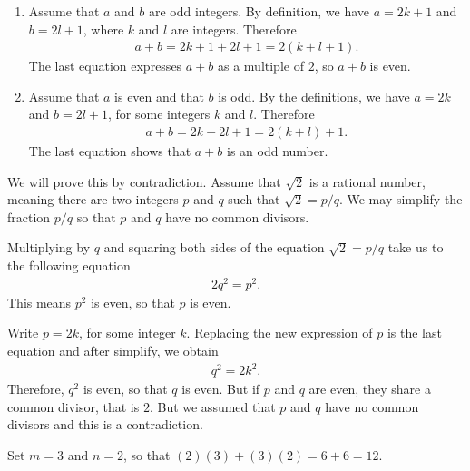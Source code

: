  \begin{problem}
 	\begin{enumerate}[label=\alph*)]
 		\item Assume that $a$ and $b$ are odd integers. By definition, we have $a = 2k + 1$ and $b = 2l + 1$, where $k$ and $l$ are integers. Therefore
 			\begin{align*}
 			a + b = 2k + 1 + 2l + 1 = 2 (k + l + 1) .
 			\end{align*}
 		The last equation expresses $a + b$ as a multiple of $2$, so $a + b$ is even.
 		\item Assume that $a$ is even and that $b$ is odd. By the definitions, we have $a = 2k$ and $b = 2l + 1$, for some integers $k$ and $l$. Therefore
 			\begin{align*}
 			a + b = 2k + 2l + 1 = 2 (k + l) + 1 .
 			\end{align*}
 		The last equation shows that $a + b$ is an odd number.
 	\end{enumerate}
 \end{problem}

 \begin{problem}
 We will prove this by contradiction. Assume that $\sqrt{2}$ is a rational number, meaning there are two integers $p$ and $q$ such that $\sqrt{2} = p /q$. We may simplify the fraction $p/q$ so that $p$ and $q$ have no common divisors. 

 Multiplying by $q$ and squaring both sides of the equation $\sqrt{2} = p/q$ take us to the following equation
 	\begin{align*}
 	2q^2 = p^2 .
 	\end{align*}
 This means $p^2$ is even, so that $p$ is even. 

 Write $p = 2k$, for some integer $k$. Replacing the new expression of $p$ is the last equation and after simplify, we obtain
 	\begin{align*}
 	q^2 = 2k^2 .
 	\end{align*}
 Therefore, $q^2$ is even, so that $q$ is even. But if $p$ and $q$ are even, they share a common divisor, that is $2$. But we assumed that $p$ and $q$ have no common divisors and this is a contradiction.
 \end{problem}

 \begin{problem}
 Set $m = 3$ and $n = 2$, so that $(2)(3) + (3)(2) = 6 + 6 = 12$.
 \end{problem}

